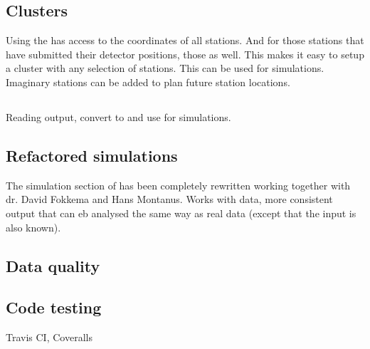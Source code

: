 \subsection{Clusters}

Using the \api \sapphire has access to the \gps coordinates of all
stations. And for those stations that have submitted their detector
positions, those as well. This makes it easy to setup a cluster with any
selection of \hisparc stations. This can be used for simulations.
Imaginary stations can be added to plan future station locations.

\subsection{\corsika}

Reading \corsika output, convert to \hdf and use for simulations.


\subsection{Refactored simulations}

The simulation section of \sapphire has been completely rewritten
working together with dr. David Fokkema and Hans Montanus. Works with
\corsika data, more consistent output that can eb analysed the same way
as real \hisparc data (except that the input is also known).


\subsection{Data quality}



\subsection{Code testing}

Travis CI, Coveralls
